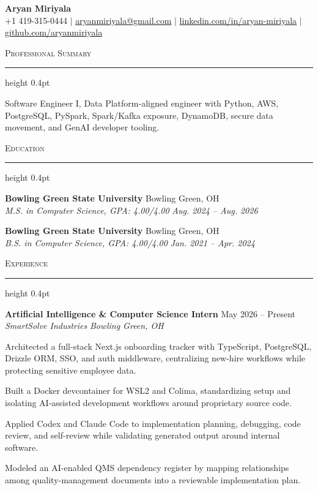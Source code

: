 \documentclass[letterpaper,11pt]{article}
\newcommand{\resumesection}[1]{%
  \par\vspace{2pt}%
  {\large\scshape #1}\par\vspace{2pt}%
  \hrule height 0.4pt\vspace{2pt}%
}
\newcommand{\resumeSubheading}[4]{
  \textbf{#1} \hfill #2\\
  \textit{#3} \hfill \textit{#4}
}
\begin{document}
\begin{center}
  {\LARGE \textbf{Aryan Miriyala}}\\[-1pt]
  \small
  +1 419-315-0444 $|$
  \href{mailto:aryanmiriyala@gmail.com}{aryanmiriyala@gmail.com} $|$
  \href{https://www.linkedin.com/in/aryan-miriyala-7788a21b6/}{linkedin.com/in/aryan-miriyala} $|$
  \href{https://github.com/aryanmiriyala}{github.com/aryanmiriyala}
\end{center}\vspace{-10pt}

\resumesection{Professional Summary}
Software Engineer I, Data Platform-aligned engineer with Python, AWS, PostgreSQL, PySpark, Spark/Kafka exposure, DynamoDB, secure data movement, and GenAI developer tooling.

\resumesection{Education}
\resumeSubheading
{Bowling Green State University}{Bowling Green, OH}
{M.S. in Computer Science, GPA: 4.00/4.00}{Aug. 2024 -- Aug. 2026}

\resumeSubheading
{Bowling Green State University}{Bowling Green, OH}
{B.S. in Computer Science, GPA: 4.00/4.00}{Jan. 2021 -- Apr. 2024}

\resumesection{Experience}
\resumeSubheading
{Artificial Intelligence \& Computer Science Intern}{May 2026 -- Present}
{SmartSolve Industries}{Bowling Green, OH}
\begin{tightitemize}
  \item Architected a full-stack Next.js onboarding tracker with TypeScript, PostgreSQL, Drizzle ORM, SSO, and auth middleware, centralizing new-hire workflows while protecting sensitive employee data.
  \item Built a Docker devcontainer for WSL2 and Colima, standardizing setup and isolating AI-assisted development workflows around proprietary source code.
  \item Applied Codex and Claude Code to implementation planning, debugging, code review, and self-review while validating generated output around internal software.
  \item Modeled an AI-enabled QMS dependency register by mapping relationships among quality-management documents into a reviewable implementation plan.
\end{tightitemize}
\end{document}
